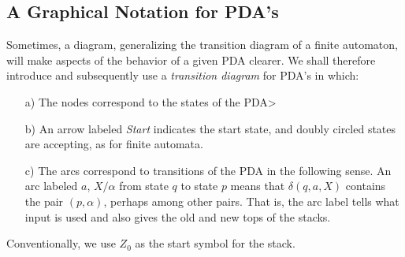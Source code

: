 \documentclass[]{article}
\begin{document}
  \subsection*{A Graphical Notation for PDA's}
    Sometimes, a diagram, generalizing the transition diagram of a finite
    automaton, will make aspects of the behavior of a given PDA clearer. We
    shall therefore introduce and subsequently use a \emph{transition diagram}
    for PDA's in which:
      \begin{enumerate}
        \item[a)] The nodes correspond to the states of the PDA>
        \item[b)] An arrow labeled \emph{Start} indicates the start state, and
        doubly circled states are accepting, as for finite automata.
        \item[c)] The arcs correspond to transitions of the PDA in the following
        sense. An arc labeled $a$, $X/\alpha$ from state $q$ to state $p$ means
        that $\delta(q,a,X)$ contains the pair $(p,\alpha)$, perhaps among other
        pairs. That is, the arc label tells what input is used and also gives
        the old and new tops of the stacks.
      \end{enumerate}
    Conventionally, we use $Z_0$ as the start symbol for the stack.
\end{document}
